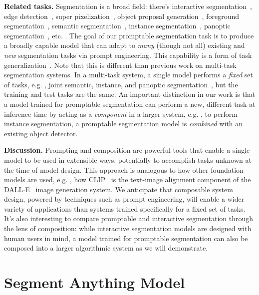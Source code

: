 \textbf{Related tasks.} Segmentation is a broad field: there's interactive segmentation~\cite{kass1988snakes,xu2016deep}, edge detection~\cite{arbelaez2010contour}, super pixelization~\cite{ren2003learning}, object proposal generation~\cite{alexe2010object}, foreground segmentation~\cite{stauffer1999adaptive}, semantic segmentation~\cite{shotton2006textonboost}, instance segmentation~\cite{Lin2014}, panoptic segmentation~\cite{kirillov2019panoptic}, etc. . The goal of our promptable segmentation task is to produce a broadly capable model that can adapt to \emph{many} (though not all) existing and \emph{new} segmentation tasks via prompt engineering. This capability is a form of task generalization~\cite{da2012learning}. Note that this is different than previous work on multi-task segmentation systems. In a multi-task system, a single model performs a \emph{fixed} set of tasks, e.g. , joint semantic, instance, and panoptic segmentation~\cite{zhang2021knet,cheng2022masked,jain2022oneformer}, but the training and test tasks are the same. An important distinction in our work is that a model trained for promptable segmentation can perform a new, different task at inference time by acting as a \emph{component} in a larger system, e.g. , to perform instance segmentation, a promptable segmentation model is \emph{combined} with an existing object detector.

\textbf{Discussion.} Prompting and composition are powerful tools that enable a single model to be used in extensible ways, potentially to accomplish tasks unknown at the time of model design. This approach is analogous to how other foundation models are used, e.g. , how CLIP~\cite{Radford2021} is the text-image alignment component of the DALL$\cdot$E~\cite{Ramesh2021} image generation system. We anticipate that composable system design, powered by techniques such as prompt engineering, will enable a wider variety of applications than systems trained specifically for a fixed set of tasks. It's also interesting to compare promptable and interactive segmentation through the lens of composition: while interactive segmentation models are designed with human users in mind, a model trained for promptable segmentation can also be composed into a larger algorithmic system as we will demonstrate.

\section{Segment Anything Model}\label{sec:model}


